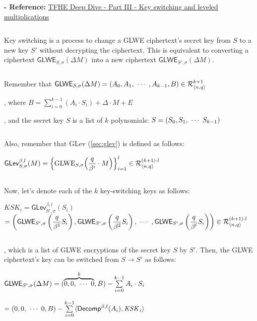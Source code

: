 \textbf{- Reference:} 
\href{https://www.zama.ai/post/tfhe-deep-dive-part-3}{TFHE Deep Dive - Part III - Key switching and leveled multiplications}~\cite{tfhe-3}

$ $

Key switching is a process to change a GLWE ciphertext's secret key from $S$ to a new key $S'$ without decrypting the ciphertext. This is equivalent to converting a ciphertext $\textsf{GLWE}_{S,\sigma}(\Delta M)$ into a new ciphertext $\textsf{GLWE}_{S',\sigma}(\Delta M)$. 

$ $

\noindent Remember that $\textsf{GLWE}_{S,\sigma}(\Delta M) = (A_0, A_1, \text{ } \text{$\cdots$} \text{ } , A_{k-1}, B) \in \mathcal{R}_{\langle n, q \rangle }^{k + 1}$

, where $B = \sum\limits_{i=0}^{k-1}{(A_i \cdot S_i)} + \Delta \cdot M + E$

, and the secret key $S$ is a list of $k$ polynomials: $S = (S_0, S_1, \text{ } \text{$\cdots$} \text{ } S_{k-1})$

$ $

\noindent Also, remember that GLev (\autoref{sec:glev}) is defined as follows: 

$\textsf{GLev}_{S, \sigma}^{\beta, l}(M) = \Bigl \{\text{GLWE}_{S, \sigma}\Bigl (\dfrac{q}{\beta^i} \cdot M \Bigr ) \Bigr \}_{i=1}^{l} \in \mathcal{R}_{\langle n, q \rangle }^{(k+1) \cdot l}$

$ $

\noindent Now, let's denote each of the $k$ key-switching keys as follows:

$\mathit{KSK}_i = \textsf{GLev}_{S', \sigma}^{\beta, l}(S_i)$ \\
$ = \left ( \textsf{GLWE}_{S', \sigma} \left ( 
 \dfrac{q}{\beta^1}S_i \right ), \textsf{GLWE}_{S', \sigma} \left ( 
 \dfrac{q}{\beta^2}S_i \right ), \text{ } \text{$\cdots$} \text{ }, \textsf{GLWE}_{S', \sigma} \left ( 
 \dfrac{q}{\beta^l}S_i \right ) \right ) \in \mathcal{R}_{\langle n, q \rangle }^{(k + 1) \cdot l}$

$ $

\noindent, which is a list of GLWE encryptions of the secret key $S$ by $S'$. Then, the GLWE ciphertext's key can be switched from $S \rightarrow S'$ as follows: 


\begin{tcolorbox}[title={\textbf{\tboxlabel{\ref*{sec:glwe-key-switching}} GLWE Key Switching}}]
$\textsf{GLWE}_{S',\sigma}(\Delta M) = (\overbrace{0, 0, \text{ } \text{$\cdots$} \text{ } 0}^k, B) - \sum \limits_{i=0}^{k-1} A_i \cdot S_i$

\text{ } \text{ } $ = (0, 0, \text{ } \text{$\cdots$} \text{ } 0, B) - \sum \limits_{i=0}^{k-1} \langle \textsf{Decomp}^{\beta, l}(A_i), \mathit{KSK}_i \rangle$
\end{tcolorbox}




